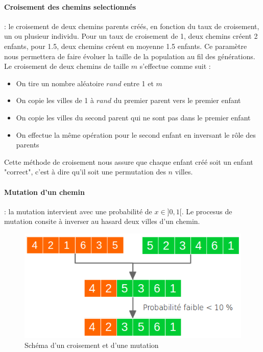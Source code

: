\documentclass{article}
\begin{document}
    \paragraph{Croisement des chemins selectionnés}: le croisement de deux chemins parents créés, en fonction du taux de croisement, un ou plusieur individu. Pour un taux de croisement de 1, deux chemins créent 2 enfants, pour 1.5, deux chemins créent en moyenne 1.5 enfants. Ce paramètre nous permettera de faire évoluer la taille de la population au fil des générations.
    Le croisement de deux chemins de taille $m$ s'effectue comme suit :
    \begin{itemize}
    	\item On tire un nombre aléatoire $rand$ entre 1 et $m$
    	\item On copie les villes de 1 à $rand$ du premier parent vers le premier enfant
    	\item On copie les villes du second parent qui ne sont pas dans le premier enfant
    	\item On effectue la même opération pour le second enfant en inversant le rôle des parents
    \end{itemize}

    Cette méthode de croisement nous assure que chaque enfant créé soit un enfant "correct", c'est à dire qu'il soit une permutation des $n$ villes.

    \paragraph{Mutation d'un chemin}: la mutation intervient avec une probabilité de $x \in ]0, 1[$. Le procesus de mutation consite à inverser au hasard deux villes d'un chemin.

	\begin{figure}
		\begin{center}
			\includegraphics[scale=0.5]{croisement.png}
		\end{center}

		\caption{Schéma d'un croisement et d'une mutation}

		\label{Schéma d'un croisement et d'une mutation}
	\end{figure}
\end{document}

